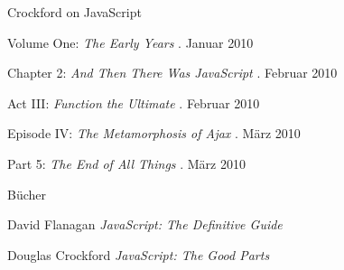 \begin{frame}{Crockford on JavaScript}
  \begin{thebibliography}{1}
     Volume One:
    \emph{The Early Years}
    . Januar 2010
    
     Chapter 2:
    \emph{And Then There Was JavaScript}
    . Februar 2010
    
     Act III:
    \emph{Function the Ultimate}
    . Februar 2010
    
     Episode IV:
    \emph{The Metamorphosis of Ajax}
    . März 2010
    
     Part 5:
    \emph{The End of All Things}
    . März 2010
    
  \end{thebibliography}
\end{frame}

\begin{frame}{Bücher}
  \begin{thebibliography}{1}
     David Flanagan
    \newblock \emph{JavaScript: The Definitive Guide}
    
     Douglas Crockford
    \newblock \emph{JavaScript: The Good Parts}
  \end{thebibliography}
\end{frame}

